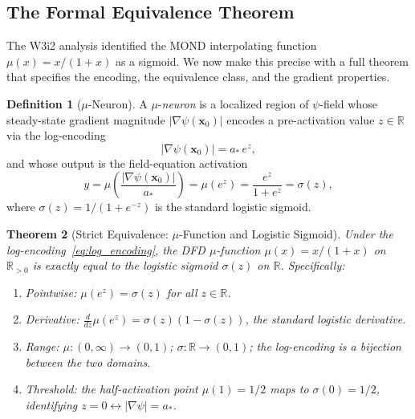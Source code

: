 \documentclass[11pt]{article}
\newtheorem{theorem}{Theorem}[section]
\theoremstyle{definition}
\newtheorem{definition}[theorem]{Definition}
\theoremstyle{remark}
\newcommand{\astar}{a_*}
\newcommand{\mufn}{\mu}
\begin{document}
\subsection{The Formal Equivalence Theorem}

The W3i2 analysis identified the MOND interpolating function
$\mufn(x) = x/(1+x)$ as a sigmoid. We now make this precise with a full
theorem that specifies the encoding, the equivalence class, and the gradient
properties.

\begin{definition}[$\mu$-Neuron]
\label{def:mu_neuron}
A $\mu$-\emph{neuron} is a localized region of $\psi$-field whose
steady-state gradient magnitude $|\nabla\psi(\mathbf{x}_0)|$ encodes a
pre-activation value $z \in \mathbb{R}$ via the log-encoding
\begin{equation}
|\nabla\psi(\mathbf{x}_0)| = \astar\,e^z,
\label{eq:log_encoding}
\end{equation}
and whose output is the field-equation activation
\begin{equation}
y = \mufn\!\left(\frac{|\nabla\psi(\mathbf{x}_0)|}{\astar}\right)
= \mufn(e^z) = \frac{e^z}{1+e^z} = \sigma(z),
\label{eq:mu_neuron_output}
\end{equation}
where $\sigma(z) = 1/(1+e^{-z})$ is the standard logistic sigmoid.
\end{definition}

\begin{theorem}[Strict Equivalence: $\mu$-Function and Logistic Sigmoid]
\label{thm:mond_sigmoid}
Under the log-encoding~\eqref{eq:log_encoding}, the DFD $\mu$-function
$\mufn(x) = x/(1+x)$ on $\mathbb{R}_{>0}$ is \emph{exactly} equal to the
logistic sigmoid $\sigma(z)$ on $\mathbb{R}$. Specifically:
\begin{enumerate}[label=(\roman*)]
\item Pointwise: $\mufn(e^z) = \sigma(z)$ for all $z \in \mathbb{R}$.
\item Derivative: $\frac{d}{dz}\mufn(e^z) = \sigma(z)(1-\sigma(z))$,
  the standard logistic derivative.
\item Range: $\mufn : (0,\infty) \to (0,1)$; $\sigma : \mathbb{R} \to (0,1)$;
  the log-encoding is a bijection between the two domains.
\item Threshold: the half-activation point $\mufn(1) = 1/2$ maps to
  $\sigma(0) = 1/2$, identifying $z=0 \leftrightarrow |\nabla\psi| = \astar$.
\end{enumerate}
\end{theorem}
\end{document}
